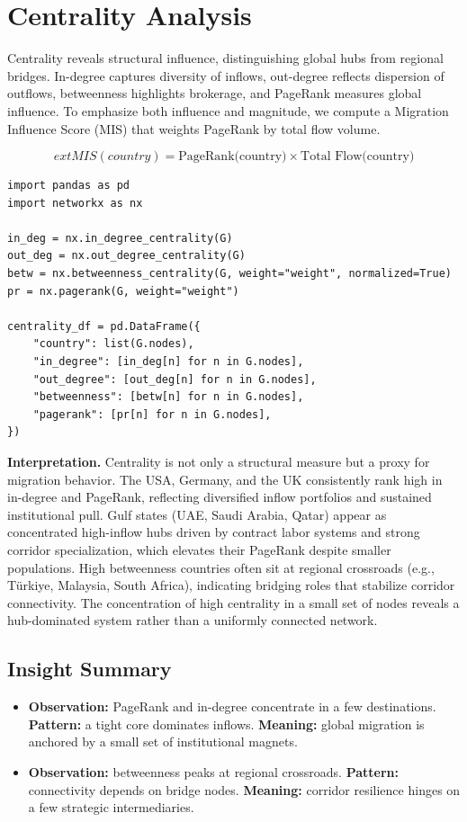 \documentclass[12pt]{report}
\begin{document}
\chapter{Centrality Analysis}
Centrality reveals structural influence, distinguishing global hubs from regional bridges. In-degree captures diversity of inflows, out-degree reflects dispersion of outflows, betweenness highlights brokerage, and PageRank measures global influence. To emphasize both influence and magnitude, we compute a Migration Influence Score (MIS) that weights PageRank by total flow volume.

\[
	ext{MIS(country)} = \text{PageRank(country)} \times \text{Total Flow(country)}
\]

\begin{lstlisting}
import pandas as pd
import networkx as nx

in_deg = nx.in_degree_centrality(G)
out_deg = nx.out_degree_centrality(G)
betw = nx.betweenness_centrality(G, weight="weight", normalized=True)
pr = nx.pagerank(G, weight="weight")

centrality_df = pd.DataFrame({
    "country": list(G.nodes),
    "in_degree": [in_deg[n] for n in G.nodes],
    "out_degree": [out_deg[n] for n in G.nodes],
    "betweenness": [betw[n] for n in G.nodes],
    "pagerank": [pr[n] for n in G.nodes],
})
\end{lstlisting}

  \textbf{Interpretation.} Centrality is not only a structural measure but a proxy for migration behavior. The USA, Germany, and the UK consistently rank high in in-degree and PageRank, reflecting diversified inflow portfolios and sustained institutional pull. Gulf states (UAE, Saudi Arabia, Qatar) appear as concentrated high-inflow hubs driven by contract labor systems and strong corridor specialization, which elevates their PageRank despite smaller populations. High betweenness countries often sit at regional crossroads (e.g., T\"urkiye, Malaysia, South Africa), indicating bridging roles that stabilize corridor connectivity. The concentration of high centrality in a small set of nodes reveals a hub-dominated system rather than a uniformly connected network.

\section*{Insight Summary}
\begin{itemize}
  \item \textbf{Observation:} PageRank and in-degree concentrate in a few destinations. \textbf{Pattern:} a tight core dominates inflows. \textbf{Meaning:} global migration is anchored by a small set of institutional magnets.
  \item \textbf{Observation:} betweenness peaks at regional crossroads. \textbf{Pattern:} connectivity depends on bridge nodes. \textbf{Meaning:} corridor resilience hinges on a few strategic intermediaries.
\end{itemize}
\end{document}
